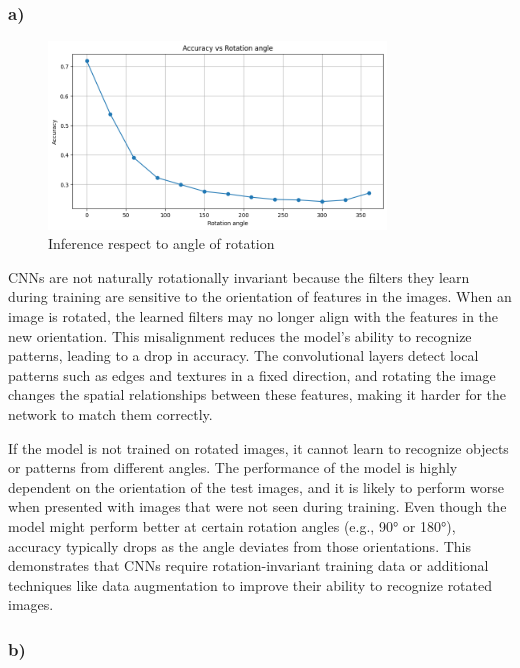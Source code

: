\documentclass{article}
\begin{document}
\subsubsection*{a)}

\begin{figure}[H]
    \centering
    \includegraphics[width=0.8\textwidth]{rot_angles.png}
    \caption{Inference respect to angle of rotation}
    \label{fig:angle_inference}
\end{figure}

CNNs are not naturally rotationally invariant because the filters they learn during training are sensitive to the orientation
of features in the images. When an image is rotated, the learned filters may no longer align with the features in the new
orientation. This misalignment reduces the model’s ability to recognize patterns, leading to a drop in accuracy. The
convolutional layers detect local patterns such as edges and textures in a fixed direction, and rotating the image changes
the spatial relationships between these features, making it harder for the network to match them correctly.

If the model is not trained on rotated images, it cannot learn to recognize objects or patterns from different angles.
The performance of the model is highly dependent on the orientation of the test images, and it is likely to perform worse
when presented with images that were not seen during training. Even though the model might perform better at certain rotation
angles (e.g., 90° or 180°), accuracy typically drops as the angle deviates from those orientations. This demonstrates that
CNNs require rotation-invariant training data or additional techniques like data augmentation to improve their ability to
recognize rotated images.

\subsubsection*{b)}
\end{document}
